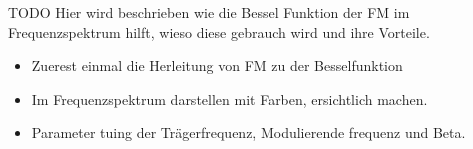 TODO
Hier wird beschrieben wie die Bessel Funktion der FM im Frequenzspektrum hilft, wieso diese gebrauch wird und ihre Vorteile.
\begin{itemize}
    \item Zuerest einmal die Herleitung von FM zu der Besselfunktion
    \item Im Frequenzspektrum darstellen mit Farben, ersichtlich machen. 
    \item Parameter tuing der Trägerfrequenz, Modulierende frequenz und Beta. 
\end{itemize}





